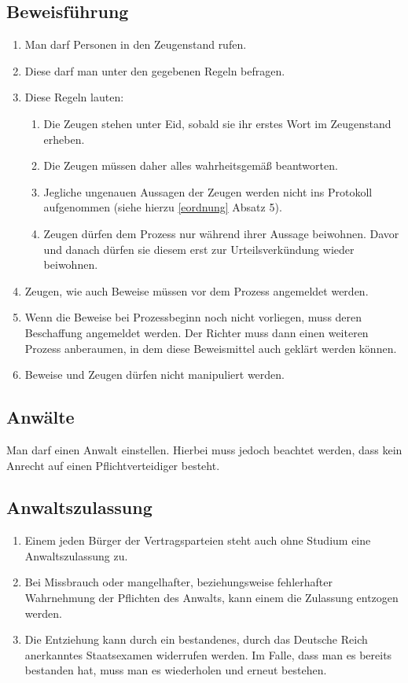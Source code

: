 \documentclass{article}
\begin{document}
\subsection{Beweisführung}\label{zeugen}
\begin{enumerate}[(1)]
    \item Man darf Personen in den Zeugenstand rufen.
    \item Diese darf man unter den gegebenen Regeln befragen.
    \item Diese Regeln lauten:
        \begin{enumerate}[1.]
            \item Die Zeugen stehen unter Eid, sobald sie ihr erstes Wort im Zeugenstand erheben.
            \item Die Zeugen müssen daher alles wahrheitsgemäß beantworten.
            \item Jegliche ungenauen Aussagen der Zeugen werden nicht ins Protokoll aufgenommen (siehe hierzu \ref{eordnung} Absatz 5).
            \item Zeugen dürfen dem Prozess nur während ihrer Aussage beiwohnen. Davor und danach dürfen sie diesem erst zur Urteilsverkündung wieder beiwohnen.
        \end{enumerate}
    \item Zeugen, wie auch Beweise müssen vor dem Prozess angemeldet werden.
    \item Wenn die Beweise bei Prozessbeginn noch nicht vorliegen, muss deren Beschaffung angemeldet werden. Der Richter muss dann einen weiteren Prozess anberaumen, in dem diese Beweismittel auch geklärt werden können.
    \item Beweise und Zeugen dürfen nicht manipuliert werden.
\end{enumerate}

\subsection{Anwälte}
Man darf einen Anwalt einstellen. Hierbei muss jedoch beachtet werden, dass kein Anrecht auf einen Pflichtverteidiger besteht.

\subsection{Anwaltszulassung}
\begin{enumerate}[(1)]
    \item Einem jeden Bürger der Vertragsparteien steht auch ohne Studium eine Anwaltszulassung zu.
    \item Bei Missbrauch oder mangelhafter, beziehungsweise fehlerhafter Wahrnehmung der Pflichten des Anwalts, kann einem die Zulassung entzogen werden.
    \item Die Entziehung kann durch ein bestandenes, durch das Deutsche Reich anerkanntes Staatsexamen widerrufen werden. Im Falle, dass man es bereits bestanden hat, muss man es wiederholen und erneut bestehen.
\end{enumerate}
    
\end{document}
